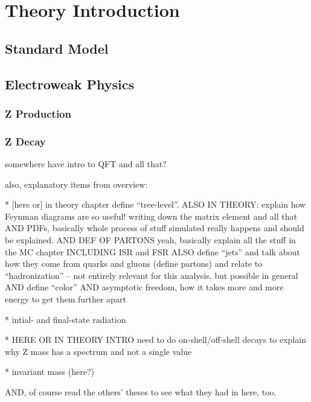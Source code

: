 \chapter{Theory Introduction}
\section{Standard Model}
\section{Electroweak Physics}
\subsection{Z Production}
\subsection{Z Decay}

somewhere have intro to QFT and all that?  

also, explanatory items from overview:

   * [here or] in theory chapter define ``tree-level''.  
ALSO IN THEORY: explain how Feynman diagrams are so useful! 
writing down the matrix element and all that
AND PDFs, basically whole process of stuff simulated 
really happens and should be explained.  
AND DEF OF PARTONS
yeah, basically explain all the stuff in the MC chapter
INCLUDING ISR and FSR
ALSO define ``jets'' and talk about how they come from 
quarks and gluons (define partons) and relate to ``hadronization'' -- 
not entirely relevant for this analysis, 
but possible in general
AND define ``color''
AND asymptotic freedom, how it takes more and more energy to get them further apart

   * intial- and final-state radiation

   * HERE OR IN THEORY INTRO need to do on-shell/off-shell decays 
to explain why Z mass has a spectrum and not a single value

   * invariant mass (here?)

AND, of course read the others' theses to see what they had in here, too.  



